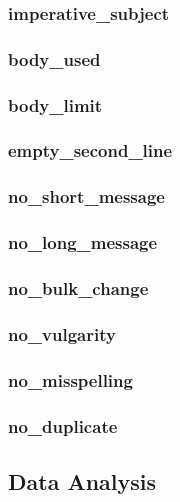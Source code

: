 \subsubsection{imperative_subject}
\label{subs:imperative_subject}

\subsubsection{body_used}
\label{subs:body_used}

\subsubsection{body_limit}
\label{subs:body_limit}

\subsubsection{empty_second_line}
\label{subs:empty_second_line}

\subsubsection{no_short_message}
\label{subs:no_short_message}

\subsubsection{no_long_message}
\label{subs:no_long_message}

\subsubsection{no_bulk_change}
\label{subs:no_bulk_change}

\subsubsection{no_vulgarity}
\label{subs:no_vulgarity}

\subsubsection{no_misspelling}
\label{subs:no_misspelling}

\subsubsection{no_duplicate}
\label{subs:no_duplicate}


\subsection{Data Analysis}

